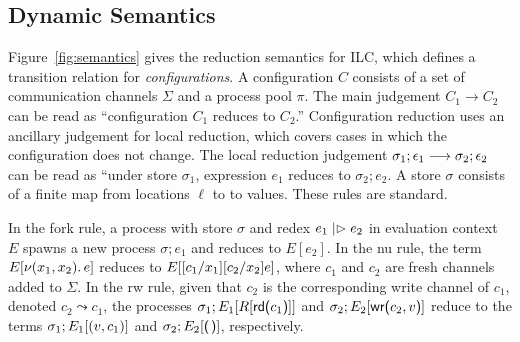 

\subsection{Dynamic Semantics}
\label{subsec:semantics}



Figure~\ref{fig:semantics} gives the reduction semantics for ILC, which defines
a transition relation for \emph{configurations}. A configuration $C$ consists of
a set of communication channels $\Sigma$ and a process pool $\pi$. The main judgement
$C_1 \longrightarrow C_2$ can be read as ``configuration $C_1$ reduces to $C_2$.''
Configuration reduction uses an ancillary judgement for local reduction, which
covers cases in which the configuration does not change. The local reduction
judgement $\sigma_1; \epsilon_1 \longrightarrow \sigma_2; \epsilon_2$ can be read as ``under store $\sigma_1$,
expression $e_1$ reduces to $\sigma_{2}; e_2$. A store $\sigma$ consists of a finite map
from locations $\ell$ to to values. These rules are standard.

In the fork rule, a process with store $\sigma$ and redex $e_1 \mathrel{|\rhd} e_2$ in
evaluation context $E$ spawns a new process $\sigma; e_1$ and reduces to $E[e_2]$. In
the nu rule, the term $E[ \nu(x_1, x_2).\,e ]$ reduces to $E[
  [c_1/x_1][c_2/x_2]e ]$, where $c_1$ and $c_2$ are fresh
channels added to $\Sigma$. In the rw rule, given that $c_2$ is the corresponding
write channel of $c_1$, denoted $c_2 \leadsto c_1$, the processes $\sigma_1 ; E_1[R[
    \text{\textsf{rd}}\textsf{(}{c_1}\textsf{)}] ]$ and $\sigma_2 ; E_2[ \text{\textsf{wr}}\textsf{(}{c_2},{v}\textsf{)}]$ reduce to the
terms $\sigma_1 ; E_1[ (v, c_1)]$ and $\sigma_2 ; E_2[ \eUnit]$, respectively.

\begin{comment}






\end{comment}


